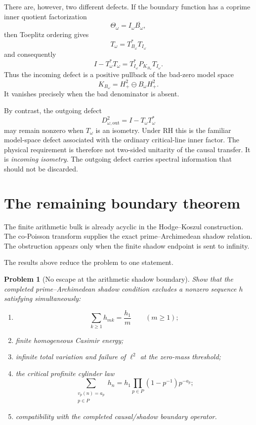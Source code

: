 \documentclass[11pt]{article}
\newtheorem{problem}[theorem]{Problem}
\theoremstyle{definition}
\theoremstyle{remark}
\begin{document}
There are, however, two different defects.  If the boundary function has a coprime inner
quotient factorization
\[
\Theta_\omega=I_\omega\overline{B_\omega},
\]
then Toeplitz ordering gives
\[
T_\omega=T_{B_\omega}^*T_{I_\omega}
\]
and consequently
\[
\boxed{
I-T_\omega^*T_\omega
=
T_{I_\omega}^*P_{K_{B_\omega}}T_{I_\omega}.
}
\]
Thus the incoming defect is a positive pullback of the bad-zero model space
\[
K_{B_\omega}=H^2_+\ominus B_\omega H^2_+.
\]
It vanishes precisely when the bad denominator is absent.

By contrast, the outgoing defect
\[
D_{\omega,\mathrm{out}}^2
=
I-T_\omega T_\omega^*
\]
may remain nonzero when \(T_\omega\) is an isometry.  Under RH this is the familiar
model-space defect associated with the ordinary critical-line inner factor.  The physical
requirement is therefore not two-sided unitarity of the causal transfer.  It is
\emph{incoming isometry}.  The outgoing defect carries spectral information that should
not be discarded.

\section{The remaining boundary theorem}

The finite arithmetic bulk is already acyclic in the Hodge--Koszul construction.  The co-Poisson transform supplies the exact prime--Archimedean shadow relation.  The obstruction appears only when the finite shadow endpoint is sent to infinity.

The results above reduce the problem to one statement.

\begin{problem}[No escape at the arithmetic shadow boundary]
Show that the completed prime--Archimedean shadow condition excludes a nonzero sequence \(h\) satisfying simultaneously:
\begin{enumerate}[label=(\roman*)]
\item
\[
\sum_{k\ge1}h_{mk}=\frac{h_1}{m}
\qquad(m\ge1);
\]
\item finite homogeneous Casimir energy;
\item infinite total variation and failure of \(\ell^2\) at the zero-mass threshold;
\item the critical profinite cylinder law
\[
\sum_{\substack{v_p(n)=a_p\\p\in P}}h_n
=
h_1\prod_{p\in P}(1-p^{-1})p^{-a_p};
\]
\item compatibility with the completed causal/shadow boundary operator.
\end{enumerate}
\end{problem}
\end{document}
